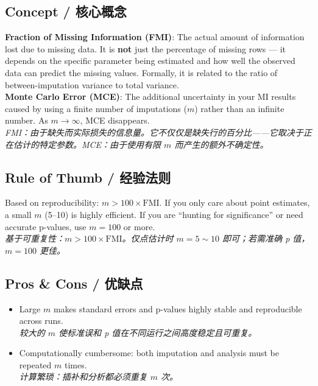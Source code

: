 \documentclass[9pt, a4paper]{article}
\begin{document}
\subsection{Concept / 核心概念}
\begin{tcolorbox}[defbox]
    \textbf{Fraction of Missing Information (FMI)}: The actual amount of information lost due to missing data. It is \textbf{not} just the percentage of missing rows --- it depends on the specific parameter being estimated and how well the observed data can predict the missing values. Formally, it is related to the ratio of between-imputation variance to total variance.\\[3pt]
    \textbf{Monte Carlo Error (MCE)}: The additional uncertainty in your MI results caused by using a finite number of imputations ($m$) rather than an infinite number. As $m \to \infty$, MCE disappears.\\[3pt]
    \textit{FMI：由于缺失而实际损失的信息量。它不仅仅是缺失行的百分比——它取决于正在估计的特定参数。MCE：由于使用有限 $m$ 而产生的额外不确定性。}
\end{tcolorbox}

\subsection{Rule of Thumb / 经验法则}
Based on reproducibility: $m > 100 \times \text{FMI}$. If you only care about point estimates, a small $m$ (5--10) is highly efficient. If you are ``hunting for significance'' or need accurate p-values, use $m = 100$ or more.\\
\textit{基于可重复性：$m > 100 \times \text{FMI}$。仅点估计时 $m = 5 \sim 10$ 即可；若需准确 p 值，$m = 100$ 更佳。}

\subsection{Pros \& Cons / 优缺点}
\begin{tcolorbox}[prosbox]
    \begin{itemize}
        \item [\ding{51}] Large $m$ makes standard errors and p-values highly stable and reproducible across runs.\\
        \textit{较大的 $m$ 使标准误和 p 值在不同运行之间高度稳定且可重复。}
    \end{itemize}
\end{tcolorbox}
\begin{tcolorbox}[consbox]
    \begin{itemize}
        \item [\ding{55}] Computationally cumbersome: both imputation and analysis must be repeated $m$ times.\\
        \textit{计算繁琐：插补和分析都必须重复 $m$ 次。}
    \end{itemize}
\end{tcolorbox}
\end{document}
